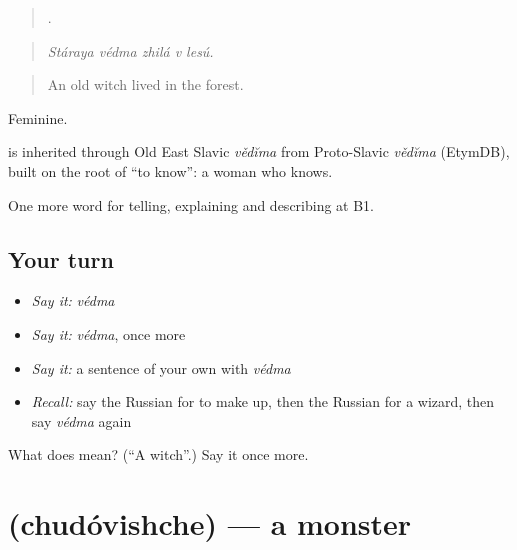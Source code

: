 \begin{quote}
    .
\end{quote}

\begin{quote}
\emph{Stáraya védma zhilá v lesú.}
\end{quote}

\begin{quote}
An old witch lived in the forest.
\end{quote}

Feminine.

\begin{cousinweb}
\emph{} is inherited through Old East Slavic \emph{vědĭma} from Proto-Slavic \emph{vědĭma} (EtymDB), built on the root of \emph{} \textquotedblleft{}to know\textquotedblright{}: a woman who knows.
\end{cousinweb}

\begin{grammarlens}[title={What you've built}]
One more word for telling, explaining and describing at B1.
\end{grammarlens}

\subsection*{Your turn}
\begin{itemize}
\raggedright
  \item \emph{Say it:} \emph{védma}
  \item \emph{Say it:} \emph{védma}, once more
  \item \emph{Say it:} a sentence of your own with \emph{védma}
  \item \emph{Recall:} say the Russian for to make up, then the Russian for a wizard, then say \emph{védma} again
\end{itemize}

\begin{tcolorbox}[breakable,colback=teal!4,colframe=teal!35!black,title={Before you move on}]
What does  mean? (\textquotedblleft{}A witch\textquotedblright{}.) Say it once more.
\end{tcolorbox}
\section[\texorpdfstring{\ru{чудовище} (chudóvishche)}{чудовище (chudóvishche)}]{ (chudóvishche) — a monster}

